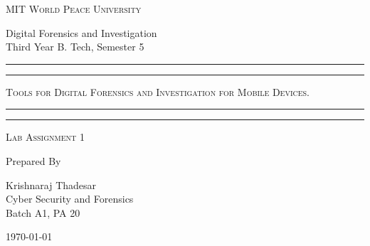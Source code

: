 \documentclass[11pt]{article}
\begin{document}
\begin{titlepage}
    \centering


    \huge\textsc{
        MIT World Peace University
    }\\

    \vspace{0.75\baselineskip} %

    \LARGE{
        Digital Forensics and Investigation\\
        Third Year B. Tech, Semester 5
    }

    \vfill %


    \rule{\textwidth}{1.6pt}\vspace*{-\baselineskip}\vspace*{2pt}
    \rule{\textwidth}{0.6pt}
    \vspace{0.75\baselineskip} %



    \huge{\textsc{
            Tools for Digital Forensics and Investigation for Mobile Devices.
        }} \\



    \vspace{0.5\baselineskip} %
    \rule{\textwidth}{0.6pt}\vspace*{-\baselineskip}\vspace*{2.8pt}
    \rule{\textwidth}{1.6pt}

    \vspace{1\baselineskip} %


    \LARGE\textsc{
        Lab Assignment 1
    } %
    \vfill


    Prepared By
    \vspace{0.5\baselineskip} %

    \Large{
        Krishnaraj Thadesar \\
        Cyber Security and Forensics\\
        Batch A1, PA 20
    }


    \vspace{0.5\baselineskip} %
    \today

\end{titlepage}
\end{document}
